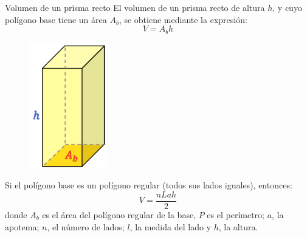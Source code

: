
\begin{infocard}{Volumen de un prisma recto}
    El volumen de un prisma recto de altura $h$, y cuyo polígono base tiene un área $A_b$, se obtiene mediante la expresión:
    \[
        V = A_b h
    \]
    \begin{figure}[H]
        \centering
        \includegraphics[width=0.3\textwidth]{../images/20230319192423}
        \caption{}
        \label{fig:20230319192423}
    \end{figure}
    
    Si el polígono base es un polígono regular (todos sus lados iguales), entonces:
    \[
        V  = \dfrac{nLah}{2}
    \]
    donde $A_b$ es el área del polígono regular de la base, $P$ es el perímetro; $a$, la apotema; $n$, el número de
    lados; $l$, la medida del lado y $h$, la altura.
\end{infocard}



